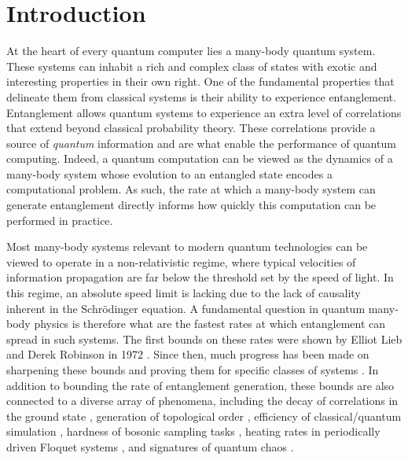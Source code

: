 \chapter{Introduction}

At the heart of every quantum computer lies a many-body quantum system. These systems can inhabit a rich and complex class of states with exotic and interesting properties in their own right. One of the fundamental properties that delineate them from classical systems is their ability to experience entanglement. Entanglement allows quantum systems to experience an extra level of correlations that extend beyond classical probability theory. These correlations provide a source of \emph{quantum} information and are what enable the performance of quantum computing. Indeed, a quantum computation can be viewed as the dynamics of a many-body system whose evolution to an entangled state encodes a computational problem. As such, the rate at which a many-body system can generate entanglement directly informs how quickly this computation can be performed in practice.

Most many-body systems relevant to modern quantum technologies can be viewed to operate in a non-relativistic regime,
where typical velocities of information propagation are far below the threshold set by the speed of light. In this regime, an absolute speed limit is lacking due to the lack of causality inherent in the Schr\"odinger equation. A fundamental question in quantum many-body physics is therefore what are the fastest rates at which entanglement can spread in such systems.
The first bounds on these rates were shown by Elliot Lieb and Derek Robinson in 1972 \cite{LR}.
Since then, much progress has been made on sharpening these bounds \cite{ChenLucas2021graphtheory,WangHazzard2020} and proving them for specific classes of systems \cite{Tran2019a,Chen2019,kuwaharaStrictlyLinearLight2020,Tran2021b}.
In addition to bounding the rate of entanglement generation, these bounds are also connected to a diverse array of phenomena, including the decay of correlations in the ground state \cite{Hastings2006}, generation of topological order \cite{Bravyi2006, Bravyi2010}, efficiency of classical/quantum simulation \cite{Osborne2006,Tran2019a}, hardness of bosonic sampling tasks \cite{Deshpande2018}, heating rates in periodically driven Floquet systems \cite{Abanin2015,Tran2019b}, and signatures of quantum chaos \cite{Lashkari2013,Guo2019}.

